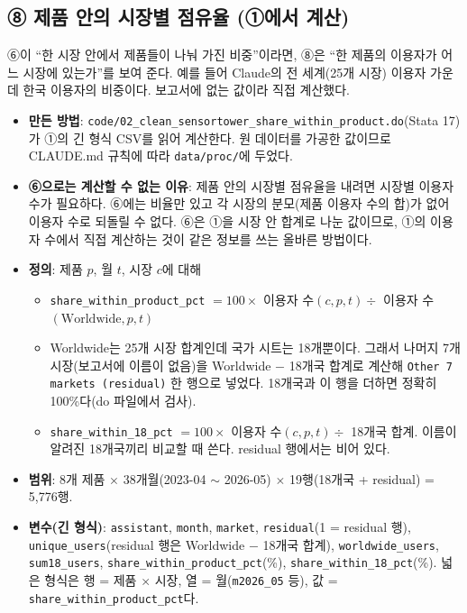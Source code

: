 \documentclass[11pt]{article}
\begin{document}
\subsection{⑧ 제품 안의 시장별 점유율 (①에서 계산)}

⑥이 ``한 시장 안에서 제품들이 나눠 가진 비중''이라면, ⑧은 ``한 제품의 이용자가 어느 시장에 있는가''를 보여 준다. 예를 들어 Claude의 전 세계(25개 시장) 이용자 가운데 한국 이용자의 비중이다. 보고서에 없는 값이라 직접 계산했다.

\begin{itemize}
  \item \textbf{만든 방법}: \texttt{code/02\_clean\_sensortower\_share\_within\_product.do}(Stata 17)가 ①의 긴 형식 CSV를 읽어 계산한다. 원 데이터를 가공한 값이므로 CLAUDE.md 규칙에 따라 \texttt{data/proc/}에 두었다.
  \item \textbf{⑥으로는 계산할 수 없는 이유}: 제품 안의 시장별 점유율을 내려면 시장별 이용자 수가 필요하다. ⑥에는 비율만 있고 각 시장의 분모(제품 이용자 수의 합)가 없어 이용자 수로 되돌릴 수 없다. ⑥은 ①을 시장 안 합계로 나눈 값이므로, ①의 이용자 수에서 직접 계산하는 것이 같은 정보를 쓰는 올바른 방법이다.
  \item \textbf{정의}: 제품 $p$, 월 $t$, 시장 $c$에 대해
  \begin{itemize}
    \item \texttt{share\_within\_product\_pct} $= 100 \times$ 이용자 수$(c,p,t) \div$ 이용자 수$(\text{Worldwide},p,t)$
    \item Worldwide는 25개 시장 합계인데 국가 시트는 18개뿐이다. 그래서 나머지 7개 시장(보고서에 이름이 없음)을 Worldwide $-$ 18개국 합계로 계산해 \texttt{Other 7 markets (residual)} 한 행으로 넣었다. 18개국과 이 행을 더하면 정확히 100\%다(do 파일에서 검사).
    \item \texttt{share\_within\_18\_pct} $= 100 \times$ 이용자 수$(c,p,t) \div$ 18개국 합계. 이름이 알려진 18개국끼리 비교할 때 쓴다. residual 행에서는 비어 있다.
  \end{itemize}
  \item \textbf{범위}: 8개 제품 $\times$ 38개월(2023-04 $\sim$ 2026-05) $\times$ 19행(18개국 + residual) = 5,776행.
  \item \textbf{변수(긴 형식)}: \texttt{assistant}, \texttt{month}, \texttt{market}, \texttt{residual}(1 = residual 행), \texttt{unique\_users}(residual 행은 Worldwide $-$ 18개국 합계), \texttt{worldwide\_users}, \texttt{sum18\_users}, \texttt{share\_within\_product\_pct}(\%), \texttt{share\_within\_18\_pct}(\%). 넓은 형식은 행 = 제품 $\times$ 시장, 열 = 월(\texttt{m2026\_05} 등), 값 = \texttt{share\_within\_product\_pct}다.

\end{itemize}
\end{document}
